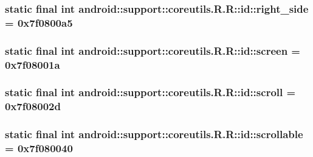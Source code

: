 \hypertarget{classandroid_1_1support_1_1coreutils_1_1_r_1_1id_728e0e89b1b6ea53c33f5d53b1ce44fb}{
\subsubsection[{right\_\-side}]{\setlength{\rightskip}{0pt plus 5cm}static final int android::support::coreutils.R.R::id::right\_\-side = 0x7f0800a5}}
\label{classandroid_1_1support_1_1coreutils_1_1_r_1_1id_728e0e89b1b6ea53c33f5d53b1ce44fb}


\hypertarget{classandroid_1_1support_1_1coreutils_1_1_r_1_1id_e77ed1edfe37aa25bf6da2a9c0e9b956}{
\subsubsection[{screen}]{\setlength{\rightskip}{0pt plus 5cm}static final int android::support::coreutils.R.R::id::screen = 0x7f08001a}}
\label{classandroid_1_1support_1_1coreutils_1_1_r_1_1id_e77ed1edfe37aa25bf6da2a9c0e9b956}


\hypertarget{classandroid_1_1support_1_1coreutils_1_1_r_1_1id_cf2719200586c3fe3c0e14910a17a29a}{
\subsubsection[{scroll}]{\setlength{\rightskip}{0pt plus 5cm}static final int android::support::coreutils.R.R::id::scroll = 0x7f08002d}}
\label{classandroid_1_1support_1_1coreutils_1_1_r_1_1id_cf2719200586c3fe3c0e14910a17a29a}


\hypertarget{classandroid_1_1support_1_1coreutils_1_1_r_1_1id_e66a78903b2b7bc9768082e185474ba1}{
\subsubsection[{scrollable}]{\setlength{\rightskip}{0pt plus 5cm}static final int android::support::coreutils.R.R::id::scrollable = 0x7f080040}}
\label{classandroid_1_1support_1_1coreutils_1_1_r_1_1id_e66a78903b2b7bc9768082e185474ba1}


